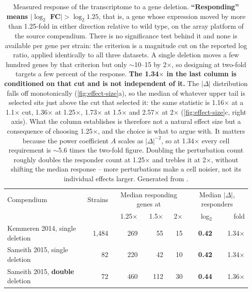 \begin{table}[htbp]\centering
\footnotesize
\caption[]{Measured response of the transcriptome to a gene deletion. \textbf{``Responding'' means $|\log_2$ FC$| > \log_2 1.25$}, that is, a gene whose expression moved by more than 1.25-fold in either direction relative to wild type, on the array platform of the source compendium. There is no significance test behind it and none is available per gene per strain: the criterion is a magnitude cut on the reported log ratio, applied identically to all three datasets. A single deletion moves a few hundred genes by that criterion but only $\sim$10--15 by 2$\times$, so designing at two-fold targets a few percent of the response. \textbf{The 1.34$\times$ in the last column is conditioned on that cut and is not independent of it.} The $|\Delta|$ distribution falls off monotonically (\cref{fig:effect-size}a), so the median of whatever upper tail is selected sits just above the cut that selected it: the same statistic is 1.16$\times$ at a 1.1$\times$ cut, 1.36$\times$ at 1.25$\times$, 1.73$\times$ at 1.5$\times$ and 2.57$\times$ at 2$\times$ (\cref{fig:effect-size}c, right axis). What the column establishes is therefore not a natural effect size but a consequence of choosing 1.25$\times$, and the choice is what to argue with. It matters because the power coefficient $A$ scales as $|\Delta|^{-2}$, so at 1.34$\times$ every cell requirement is $\sim$5.6 times the two-fold figure. Doubling the perturbation count roughly doubles the responder count at 1.25$\times$ and trebles it at 2$\times$, without shifting the median response -- more perturbations make a cell noisier, not its individual effects larger. Generated from .}\label{tab:effect-size}
\begin{tabular}{lrrrrrr}
\toprule
Compendium & Strains & \multicolumn{3}{c}{Median responding genes at} & \multicolumn{2}{c}{Median $|\Delta|$, responders} \\
 & & 1.25$\times$ & 1.5$\times$ & 2$\times$ & log$_2$ & fold \\
\midrule
Kemmeren 2014, single deletion & 1{,}484 & 269 & 55 & 15 & \textbf{0.42} & 1.34$\times$ \\
Sameith 2015, single deletion & 82 & 220 & 42 & 10 & \textbf{0.42} & 1.34$\times$ \\
Sameith 2015, \textbf{double} deletion & 72 & 460 & 112 & 30 & \textbf{0.44} & 1.36$\times$ \\
\bottomrule
\end{tabular}
\end{table}
